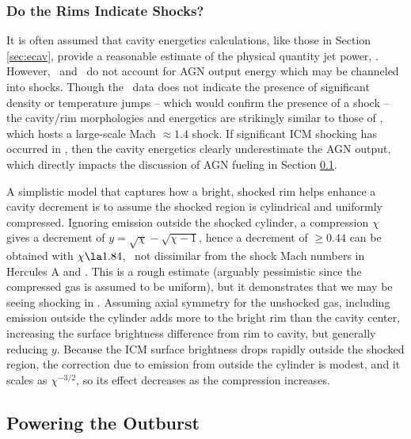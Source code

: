 \documentclass[11pt, preprint]{aastex}
\begin{document}
\subsubsection{Do the Rims Indicate Shocks?}
\label{sec:shocks}

It is often assumed that cavity energetics calculations, like those in
Section \ref{sec:ecav}, provide a reasonable estimate of the physical
quantity jet power, \pjet. However, \pcav\ and \pjet\ do not account
for AGN output energy which may be channeled into shocks. Though the
\cxo\ data does not indicate the presence of significant density or
temperature jumps -- which would confirm the presence of a shock --
the cavity/rim morphologies and energetics are strikingly similar to
those of \ms, which hosts a large-scale Mach $\approx 1.4$ shock. If
significant ICM shocking has occurred in \rbs, then the cavity
energetics clearly underestimate the AGN output, which directly
impacts the discussion of AGN fueling in Section \ref{sec:accretion}.

A simplistic model that captures how a bright, shocked rim helps
enhance a cavity decrement is to assume the shocked region is
cylindrical and uniformly compressed. Ignoring emission outside the
shocked cylinder, a compression $\chi$ gives a decrement of $y =
\sqrt{\chi} - \sqrt{\chi - 1}$, hence a decrement of $\ge 0.44$ can be
obtained with $\chi \la 1.84$, \ie\ not dissimilar from the shock Mach
numbers in Hercules A and \ms. This is a rough estimate (arguably
pessimistic since the compressed gas is assumed to be uniform), but it
demonstrates that we may be seeing shocking in \rbs. Assuming axial
symmetry for the unshocked gas, including emission outside the
cylinder adds more to the bright rim than the cavity center,
increasing the surface brightness difference from rim to cavity, but
generally reducing $y$. Because the ICM surface brightness drops
rapidly outside the shocked region, the correction due to emission
from outside the cylinder is modest, and it scales as $\chi^{-3/2}$,
so its effect decreases as the compression increases.

\subsection{Powering the Outburst}
\label{sec:accretion}
\end{document}
